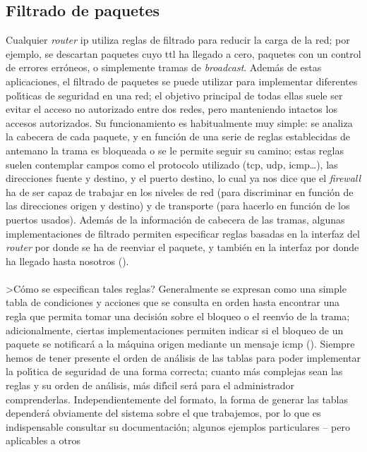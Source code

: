 \subsection{Filtrado de paquetes}
Cualquier {\it router} {\sc ip} utiliza reglas de filtrado para
reducir la carga de la red; por ejemplo, se descartan paquetes cuyo {\sc ttl}
ha llegado a cero, paquetes con un control de errores err\'oneos, o simplemente
tramas de {\it broadcast}. Adem\'as de estas aplicaciones, 
el filtrado de paquetes se puede utilizar para implementar diferentes 
pol\'{\i}ticas de seguridad en una red; el objetivo principal de todas ellas
suele ser evitar el acceso no autorizado entre dos redes, pero manteniendo
intactos los accesos autorizados. Su funcionamiento es habitualmente muy 
simple: se analiza la cabecera de cada paquete, y en funci\'on de una serie de
reglas establecidas de antemano la trama es bloqueada o se le permite seguir su
camino; estas reglas suelen contemplar campos como el protocolo utilizado 
({\sc tcp}, {\sc udp}, {\sc icmp}\ldots), las direcciones fuente y destino, y
el puerto destino, lo cual ya nos dice que el {\it firewall} ha de ser capaz de 
trabajar en los niveles de red (para discriminar en funci\'on de las
direcciones origen y destino) y de transporte (para hacerlo en funci\'on de los
puertos usados). Adem\'as de la informaci\'on de cabecera de las tramas, 
algunas implementaciones de filtrado permiten especificar reglas basadas en
la interfaz del {\it router} por donde se ha de reenviar el paquete, y tambi\'en
en la interfaz por donde ha llegado hasta nosotros (\cite{kn:cha92}).\\ 
\\>C\'omo se especifican tales reglas? Generalmente se expresan como una simple
tabla de condiciones y acciones que se consulta en orden hasta encontrar una
regla que permita tomar una decisi\'on sobre el bloqueo o el reenv\'{\i}o de la
trama; adicionalmente, ciertas implementaciones permiten indicar si el bloqueo
de un paquete se notificar\'a a la m\'aquina origen mediante un mensaje {\sc
icmp} (\cite{kn:mog89}). Siempre hemos de tener presente el orden de an\'alisis
de las tablas para poder implementar la pol\'{\i}tica de seguridad de una forma
correcta; cuanto m\'as complejas sean las reglas y su orden de an\'alisis, m\'as
dif\'{\i}cil ser\'a para el administrador comprenderlas. Independientemente del
formato, la forma de generar las tablas depender\'a obviamente del sistema 
sobre el que trabajemos, por lo que es indispensable consultar su 
documentaci\'on; algunos ejemplos particulares -- pero aplicables a otros 
